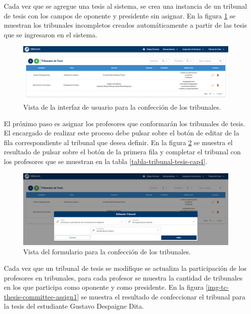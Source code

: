 Cada vez que se agregue una tesis al sistema, se crea una  
instancia de un tribunal de tesis con los campos de oponente y presidente sin asignar.
En la figura \ref{img-tc-thesis-committee-empty}  se muestran los tribunales incompletos creados 
automáticamente a partir de las tesis que se ingresaron en el sistema.

\begin{figure}[H]
    \includegraphics[scale=0.3]{Graphics/Implementation/Tesis/thesis-committee-empty.png}
    \caption{Vista de la interfaz de usuario para la confección de los tribunales.}
    \label{img-tc-thesis-committee-empty}
\end{figure}


El próximo paso es asignar los profesores que conformarán  los tribunales de tesis.
El encargado de realizar este proceso debe pulsar sobre el botón de editar 
de la fila correspondiente al tribunal que desea definir. En la figura \ref{img-tc-thesis-committee-form}
se muestra el resultado de pulsar sobre el botón de la primera fila y completar el tribunal
con los profesores que se muestran en la tabla \ref{tabla-tribunal-tesis-cap4}.


\begin{figure}[H]
    \includegraphics[scale=0.3]{Graphics/Implementation/Tesis/thesis-committee-form.png}
    \caption{Vista del formulario para la confección de los tribunales.}
    \label{img-tc-thesis-committee-form}
\end{figure}


Cada vez que un tribunal de tesis se modifique se actualiza la participación de los 
profesores en tribunales, para cada profesor se muestra la cantidad de tribunales en los que 
participa como oponente y como presidente. En la figura \ref{img-tc-thesis-committee-assign1}
se muestra el resultado de confeccionar el tribunal para la tesis del estudiante Gustavo Despaigne 
Dita.


